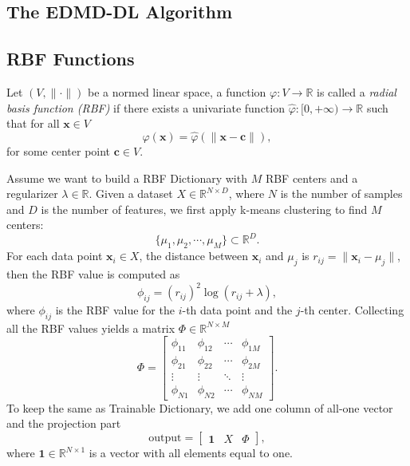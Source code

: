 \documentclass[en, bibend=bibtex]{elegantpaper}
\theoremstyle{plain}
\begin{document}
\subsection{The EDMD-DL Algorithm}

\subsection{RBF Functions}

\begin{definition}
  Let $(V, \|\cdot\|)$ be a normed linear space,
  a function $\varphi: V \rightarrow \mathbb{R}$ is called
  a \emph{radial basis function (RBF)} if
  there exists a univariate function $\hat{\varphi}: [0, +\infty) \rightarrow \mathbb{R}$
  such that for all $\mathbf{x} \in V$
  \begin{equation*}
   \varphi(\mathbf{x}) = \hat{\varphi}(\|\mathbf{x} - \mathbf{c}\|),
  \end{equation*}
  for some center point $\mathbf{c} \in V$.
\end{definition}

Assume we want to build a RBF Dictionary
with $M$ RBF centers and a regularizer $\lambda \in \mathbb{R}$.
Given a dataset $X \in \mathbb{R}^{N \times D}$,
where $N$ is the number of samples and
$D$ is the number of features,
we first apply k-means clustering to find $M$ centers:
\begin{equation*}
  \{\mu_1, \mu_2, \cdots, \mu_M\} \subset \mathbb{R}^D.
\end{equation*}
For each data point $\mathbf{x}_i \in X$,
the distance between $\mathbf{x}_i$ and $\mu_j$ is
$r_{ij} = \|\mathbf{x}_i - \mu_j\|$,
then the RBF value is computed as
\begin{equation*}
  \phi_{ij} = (r_{ij})^2 \log(r_{ij} + \lambda),
\end{equation*}
where $\phi_{ij}$ is the RBF value for the
$i$-th data point and the $j$-th center.
Collecting all the RBF values yields a matrix $\Phi \in \mathbb{R}^{N \times M}$
\begin{equation*}
  \Phi = \left[
    \begin{array}{cccc}
      \phi_{11}&\phi_{12}&\cdots&\phi_{1M}\\
      \phi_{21}&\phi_{22}&\cdots&\phi_{2M}\\
      \vdots & \vdots & \ddots & \vdots\\
      \phi_{N1}&\phi_{N2}&\cdots&\phi_{NM}
    \end{array}
  \right].
\end{equation*}
To keep the same as Trainable Dictionary,
we add one column of all-one vector and
the projection part
\begin{equation*}
  \text{output} = \left[
    \begin{array}{ccc}
      \mathbf{1}&X&\Phi
    \end{array}
  \right],
\end{equation*}
where $\mathbf{1} \in \mathbb{R}^{N\times 1}$ is a vector with all elements
equal to one.
\end{document}
